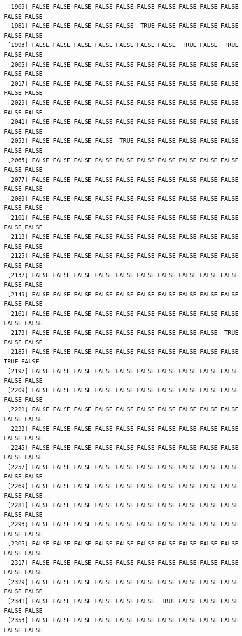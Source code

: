 \documentclass[
  a4paper,
  DIV=11,
  numbers=noendperiod]{scrartcl}
\begin{document}
\begin{verbatim}
 [1969] FALSE FALSE FALSE FALSE FALSE FALSE FALSE FALSE FALSE FALSE FALSE FALSE
 [1981] FALSE FALSE FALSE FALSE FALSE  TRUE FALSE FALSE FALSE FALSE FALSE FALSE
 [1993] FALSE FALSE FALSE FALSE FALSE FALSE FALSE  TRUE FALSE  TRUE FALSE FALSE
 [2005] FALSE FALSE FALSE FALSE FALSE FALSE FALSE FALSE FALSE FALSE FALSE FALSE
 [2017] FALSE FALSE FALSE FALSE FALSE FALSE FALSE FALSE FALSE FALSE FALSE FALSE
 [2029] FALSE FALSE FALSE FALSE FALSE FALSE FALSE FALSE FALSE FALSE FALSE FALSE
 [2041] FALSE FALSE FALSE FALSE FALSE FALSE FALSE FALSE FALSE FALSE FALSE FALSE
 [2053] FALSE FALSE FALSE FALSE  TRUE FALSE FALSE FALSE FALSE FALSE FALSE FALSE
 [2065] FALSE FALSE FALSE FALSE FALSE FALSE FALSE FALSE FALSE FALSE FALSE FALSE
 [2077] FALSE FALSE FALSE FALSE FALSE FALSE FALSE FALSE FALSE FALSE FALSE FALSE
 [2089] FALSE FALSE FALSE FALSE FALSE FALSE FALSE FALSE FALSE FALSE FALSE FALSE
 [2101] FALSE FALSE FALSE FALSE FALSE FALSE FALSE FALSE FALSE FALSE FALSE FALSE
 [2113] FALSE FALSE FALSE FALSE FALSE FALSE FALSE FALSE FALSE FALSE FALSE FALSE
 [2125] FALSE FALSE FALSE FALSE FALSE FALSE FALSE FALSE FALSE FALSE FALSE FALSE
 [2137] FALSE FALSE FALSE FALSE FALSE FALSE FALSE FALSE FALSE FALSE FALSE FALSE
 [2149] FALSE FALSE FALSE FALSE FALSE FALSE FALSE FALSE FALSE FALSE FALSE FALSE
 [2161] FALSE FALSE FALSE FALSE FALSE FALSE FALSE FALSE FALSE FALSE FALSE FALSE
 [2173] FALSE FALSE FALSE FALSE FALSE FALSE FALSE FALSE FALSE  TRUE FALSE FALSE
 [2185] FALSE FALSE FALSE FALSE FALSE FALSE FALSE FALSE FALSE FALSE  TRUE FALSE
 [2197] FALSE FALSE FALSE FALSE FALSE FALSE FALSE FALSE FALSE FALSE FALSE FALSE
 [2209] FALSE FALSE FALSE FALSE FALSE FALSE FALSE FALSE FALSE FALSE FALSE FALSE
 [2221] FALSE FALSE FALSE FALSE FALSE FALSE FALSE FALSE FALSE FALSE FALSE FALSE
 [2233] FALSE FALSE FALSE FALSE FALSE FALSE FALSE FALSE FALSE FALSE FALSE FALSE
 [2245] FALSE FALSE FALSE FALSE FALSE FALSE FALSE FALSE FALSE FALSE FALSE FALSE
 [2257] FALSE FALSE FALSE FALSE FALSE FALSE FALSE FALSE FALSE FALSE FALSE FALSE
 [2269] FALSE FALSE FALSE FALSE FALSE FALSE FALSE FALSE FALSE FALSE FALSE FALSE
 [2281] FALSE FALSE FALSE FALSE FALSE FALSE FALSE FALSE FALSE FALSE FALSE FALSE
 [2293] FALSE FALSE FALSE FALSE FALSE FALSE FALSE FALSE FALSE FALSE FALSE FALSE
 [2305] FALSE FALSE FALSE FALSE FALSE FALSE FALSE FALSE FALSE FALSE FALSE FALSE
 [2317] FALSE FALSE FALSE FALSE FALSE FALSE FALSE FALSE FALSE FALSE FALSE FALSE
 [2329] FALSE FALSE FALSE FALSE FALSE FALSE FALSE FALSE FALSE FALSE FALSE FALSE
 [2341] FALSE FALSE FALSE FALSE FALSE FALSE  TRUE FALSE FALSE FALSE FALSE FALSE
 [2353] FALSE FALSE FALSE FALSE FALSE FALSE FALSE FALSE FALSE FALSE FALSE FALSE

\end{verbatim}
\end{document}
